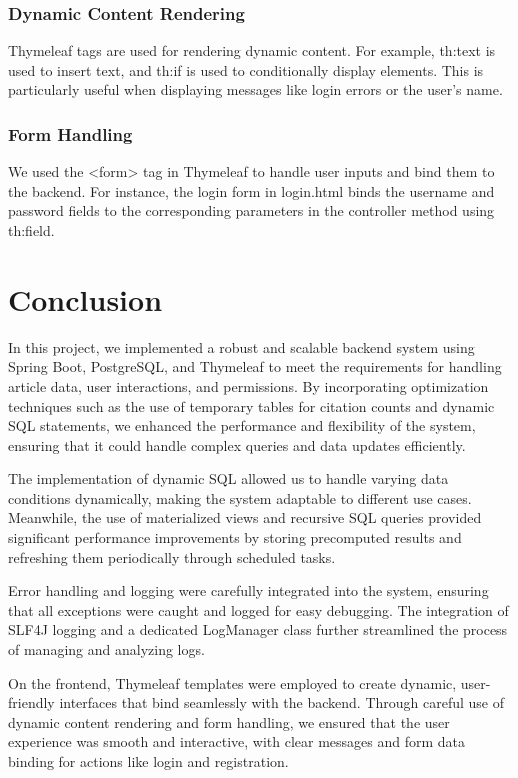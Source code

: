 \documentclass{article}
\begin{document}
\subsubsection{Dynamic Content Rendering}

Thymeleaf tags are used for rendering dynamic content. For example, th:text is used to insert text, and th:if is used to conditionally display elements. This is particularly useful when displaying messages like login errors or the user's name.
\subsubsection{Form Handling}
We used the <form> tag in Thymeleaf to handle user inputs and bind them to the backend. For instance, the login form in login.html binds the username and password fields to the corresponding parameters in the controller method using th:field.


\section{Conclusion}
In this project, we implemented a robust and scalable backend system using Spring Boot, PostgreSQL, and Thymeleaf to meet the requirements for handling article data, user interactions, and permissions. By incorporating optimization techniques such as the use of temporary tables for citation counts and dynamic SQL statements, we enhanced the performance and flexibility of the system, ensuring that it could handle complex queries and data updates efficiently.

The implementation of dynamic SQL allowed us to handle varying data conditions dynamically, making the system adaptable to different use cases. Meanwhile, the use of materialized views and recursive SQL queries provided significant performance improvements by storing precomputed results and refreshing them periodically through scheduled tasks.

Error handling and logging were carefully integrated into the system, ensuring that all exceptions were caught and logged for easy debugging. The integration of SLF4J logging and a dedicated LogManager class further streamlined the process of managing and analyzing logs.

On the frontend, Thymeleaf templates were employed to create dynamic, user-friendly interfaces that bind seamlessly with the backend. Through careful use of dynamic content rendering and form handling, we ensured that the user experience was smooth and interactive, with clear messages and form data binding for actions like login and registration.
\end{document}
